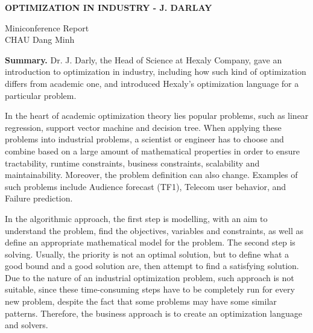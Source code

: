 \begin{center}
    \textbf{\Large OPTIMIZATION IN INDUSTRY - J. DARLAY} \\
    \vspace{0.5cm}

    Miniconference Report \\
    CHAU Dang Minh
\end{center}

\begin{center}
    \begin{minipage}{0.85\textwidth}
        \textbf{Summary.} Dr. J. Darly, the Head of Science at Hexaly Company, gave an introduction to optimization in industry, including how such kind of optimization differs from academic one, and introduced Hexaly's optimization language for a particular problem.
    \end{minipage}
\end{center}

\vspace{1cm}


In the heart of academic optimization theory lies popular problems, such as linear regression, support vector machine and decision tree. When applying these problems into industrial problems, a scientist or engineer has to choose and combine based on a large amount of mathematical properties in order to ensure tractability, runtime constraints, business constraints, scalability and maintainability. Moreover, the problem definition can also change. Examples of such problems include Audience forecast (TF1), Telecom user behavior, and Failure prediction.

In the algorithmic approach, the first step is modelling, with an aim to understand the problem, find the objectives, variables and constraints, as well as define an appropriate mathematical model for the problem. The second step is solving. Usually, the priority is not an optimal solution, but to define what a good bound and a good solution are, then attempt to find a satisfying solution. Due to the nature of an industrial optimization problem, such approach is not suitable, since these time-consuming steps have to be completely run for every new problem, despite the fact that some problems may have some similar patterns. Therefore, the business approach is to create an optimization language and solvers.


